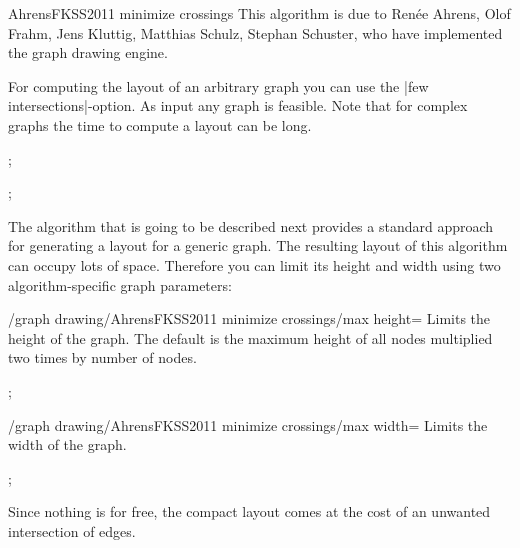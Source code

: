\begin{gdalgorithm}{AhrensFKSS2011 minimize crossings}
  This algorithm is due to  Renée Ahrens, Olof Frahm, Jens Kluttig,
  Matthias Schulz, Stephan Schuster, who have implemented the graph
  drawing engine.

  For computing the layout of an arbitrary graph you can use the
  |few intersections|-option. As input any graph is feasible. Note
  that for complex graphs the time to compute a layout can be long. 

\begin{codeexample}[]
\tikz [AhrensFKSS2011 minimize crossings, scale=2]
  ;
\end{codeexample}

\begin{codeexample}[]
\tikz [AhrensFKSS2011 minimize crossings, scale=2]
  ;
\end{codeexample}

  The algorithm that is going to be described next provides a standard
  approach for generating a layout for a generic graph. The resulting
  layout of this algorithm can occupy lots of space. Therefore you can
  limit its height and width using two algorithm-specific graph
  parameters: 

  \begin{key}{/graph drawing/AhrensFKSS2011 minimize crossings/max
      height=}
    Limits the height of the graph. The default is the maximum height
    of all nodes multiplied two times by number of nodes.
\begin{codeexample}[]
\tikz [AhrensFKSS2011 minimize crossings={max height=50pt}, scale=2]
  ;
\end{codeexample}
  \end{key}

  \begin{key}{/graph drawing/AhrensFKSS2011 minimize crossings/max
      width=} 
    Limits the width of the graph.
\begin{codeexample}[]
\tikz [AhrensFKSS2011 minimize crossings={ max width=50pt, max height=50pt},
       scale=2]
  ;
\end{codeexample}
    Since nothing is for free, the compact layout comes at the cost of
    an unwanted intersection of edges. 
  \end{key}


\end{gdalgorithm}
